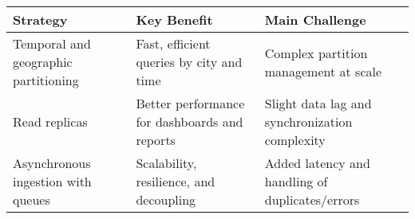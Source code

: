 \begin{center}
\begin{tabular}{|p{5.5cm}|p{5cm}|p{5.5cm}|}
\hline
\textbf{Strategy} & \textbf{Key Benefit} & \textbf{Main Challenge} \\
\hline
Temporal and geographic partitioning & Fast, efficient queries by city and time & Complex partition management at scale \\
\hline
Read replicas & Better performance for dashboards and reports & Slight data lag and synchronization complexity \\
\hline
Asynchronous ingestion with queues & Scalability, resilience, and decoupling & Added latency and handling of duplicates/errors \\
\hline
\end{tabular}
\end{center}
